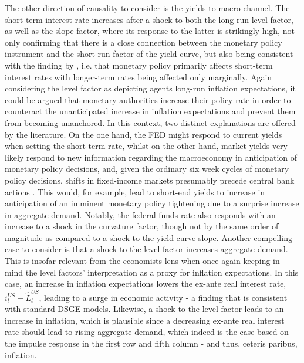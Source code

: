 The other direction of causality to consider is the yields-to-macro channel. 
The short-term interest rate increases after a shock to both the long-run level factor, as well as the slope factor, where its response to the latter is strikingly high, not only confirming that there is a close connection between the monetary policy instrument and the short-run factor of the yield curve, but also being consistent with the finding by \citet{evans1998monetary}, i.e. that monetary policy primarily affects short-term interest rates with longer-term rates being affected only marginally. 
Again considering the level factor as depicting agents long-run inflation expectations, it could be argued that monetary authorities increase their policy rate in order to counteract the unanticipated increase in inflation expectations and prevent them from becoming unanchored. 
In this context, two distinct explanations are offered by the literature. 
On the one hand, the FED might respond to current yields when setting the short-term rate, whilst on the other hand, market yields very likely respond to new information regarding the macroeconomy in anticipation of monetary policy decisions, and, given the ordinary six week cycles of monetary policy decisions, shifts in fixed-income markets presumably precede central bank actions \citep{diebold2006macroeconomy, morales2010real}.
This would, for example, lead to short-end yields to increase in anticipation of an imminent monetary policy tightening due to a surprise increase in aggregate demand.
Notably, the federal funds rate also responds with an increase to a shock in the curvature factor, though not by the same order of magnitude as compared to a shock to the yield curve slope.  
Another compelling case to consider is that a shock to the level factor increases aggregate demand. 
This is insofar relevant from the economists lens when once again keeping in mind the level factors' interpretation as a proxy for inflation expectations. 
In this case, an increase in inflation expectations lowers the ex-ante real interest rate, $i^{US}_{t} - \hat{L}^{US}_{t}$, leading to a surge in economic activity - a finding that is consistent with standard DSGE models. 
Likewise, a shock to the level factor leads to an increase in inflation, which is plausible since a decreasing ex-ante real interest rate should lead to rising aggregate demand, which indeed is the case based on the impulse response in the first row and fifth column - and thus, ceteris paribus, inflation.
